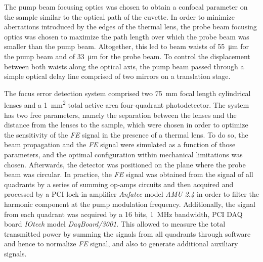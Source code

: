 \documentclass[10pt,authoryear,twocolumn]{article}
\newcommand{\FE}{\textit{FE}}
\begin{document}
The pump beam focusing optics was chosen to obtain a confocal parameter on the sample similar to the optical path of the cuvette. In order to minimize aberrations introduced by the edges of the thermal lens, the probe beam focusing optics was chosen to maximize the path length over which the probe beam was smaller than the pump beam. Altogether, this led to beam waists of \SI{55}{\micro\metre} for the pump beam and of \SI{33}{\micro\metre} for the probe beam. To control the displacement between both waists along the optical axis, the pump beam passed through a simple optical delay line comprised of two mirrors on a translation stage.

The focus error detection system comprised two \SI{75}{\milli\metre} focal length cylindrical lenses and a \SI{1}{\milli\metre^2} total active area four-quadrant photodetector. The system has two free parameters, namely the separation between the lenses and the distance from the lenses to the sample, which were chosen in order to optimize the sensitivity of the \FE{} signal in the presence of a thermal lens. To do so, the beam propagation and the \FE{} signal were simulated as a function of those parameters, and the optimal configuration within mechanical limitations was chosen. Afterwards, the detector was positioned on the plane where the probe beam was circular. In practice, the \FE{} signal was obtained from the signal of all quadrants by a series of summing op-amps circuits and then acquired and processed by a PCI lock-in amplifier \emph{Anfatec} model \emph{AMU 2.4} in order to filter the harmonic component at the pump modulation frequency. Additionally, the signal from each quadrant was acquired by a 16 bits, \SI{1}{\mega\hertz} bandwidth, PCI DAQ board \emph{IOtech} model \emph{DaqBoard/3001}. This allowed to measure the total transmitted power by summing the signals from all quadrants through software and hence to normalize \FE{} signal, and also to generate additional auxiliary signals. \\
\end{document}
